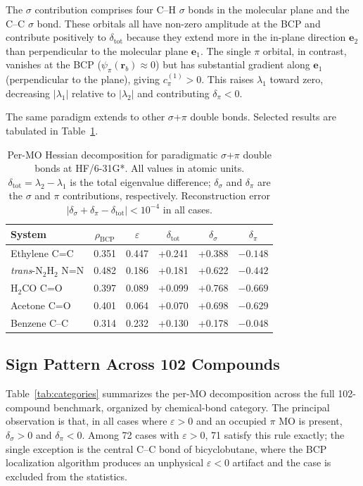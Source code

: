 \documentclass[twoside,natbib]{svjour3}
\newcommand{\rhob}{\rho_{\text{BCP}}}
\newcommand{\delsg}{\delta_{\sigma}}
\newcommand{\delpi}{\delta_{\pi}}
\newcommand{\eps}{\varepsilon}
\begin{document}
The $\sigma$ contribution comprises four C--H $\sigma$ bonds in the
molecular plane and the C--C $\sigma$ bond. These orbitals all have
non-zero amplitude at the BCP and contribute positively to
$\delta_{\text{tot}}$ because they extend more in the in-plane direction
$\mathbf{e}_2$ than perpendicular to the molecular plane $\mathbf{e}_1$.
The single $\pi$ orbital, in contrast, vanishes at the BCP
($\psi_\pi(\mathbf{r}_b) \approx 0$) but has substantial gradient along
$\mathbf{e}_1$ (perpendicular to the plane), giving $c_\pi^{(1)} > 0$.
This raises $\lambda_1$ toward zero, decreasing $|\lambda_1|$ relative to
$|\lambda_2|$ and contributing $\delpi < 0$.

The same paradigm extends to other $\sigma$+$\pi$ double bonds. Selected
results are tabulated in Table~\ref{tab:paradigm}.

\begin{table}[t]
\centering
\caption{Per-MO Hessian decomposition for paradigmatic
$\sigma$+$\pi$ double bonds at HF/6-31G*. All values in atomic units.
$\delta_{\text{tot}} = \lambda_2 - \lambda_1$ is the total eigenvalue
difference; $\delsg$ and $\delpi$ are the $\sigma$ and $\pi$
contributions, respectively. Reconstruction error
$|\delsg + \delpi - \delta_{\text{tot}}| < 10^{-4}$ in all cases.}
\label{tab:paradigm}
\begin{tabular}{lccccc}
\toprule
System & $\rhob$ & $\eps$ & $\delta_{\text{tot}}$ & $\delsg$ & $\delpi$ \\
\midrule
Ethylene C=C        & 0.351 & 0.447 & +0.241 & +0.388 & $-0.148$ \\
\textit{trans}-N$_2$H$_2$ N=N & 0.482 & 0.186 & +0.181 & +0.622 & $-0.442$ \\
H$_2$CO C=O         & 0.397 & 0.089 & +0.099 & +0.768 & $-0.669$ \\
Acetone C=O         & 0.401 & 0.064 & +0.070 & +0.698 & $-0.629$ \\
Benzene C--C        & 0.314 & 0.232 & +0.130 & +0.178 & $-0.048$ \\
\bottomrule
\end{tabular}
\end{table}

\subsection{Sign Pattern Across 102 Compounds}
\label{sec:results_full}

Table~\ref{tab:categories} summarizes the per-MO decomposition
across the full 102-compound benchmark, organized by chemical-bond
category. The principal observation is that, in all cases where
$\eps > 0$ and an occupied $\pi$ MO is present, $\delsg > 0$ and
$\delpi < 0$. Among 72 cases with $\eps > 0$, 71 satisfy this rule
exactly; the single exception is the central C--C bond of bicyclobutane,
where the BCP localization algorithm produces an unphysical
$\eps < 0$ artifact and the case is excluded from the statistics.
\end{document}
